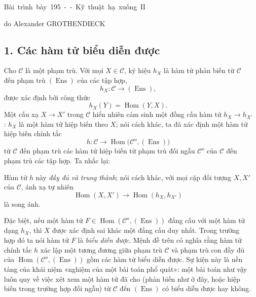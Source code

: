 \unit{Bài trình bày 195 -- Kỹ thuật hạ xuống II}
%
  {do Alexander GROTHENDIECK}


\subsection*{1. Các hàm tử biểu diễn được}

Cho $\mathcal C$ là một phạm trù. Với mọi $X\in\mathcal C$, ký hiệu $h_X$ là
hàm tử phản biến từ $\mathcal C$ đến phạm trù $(\operatorname{Ens})$ của các
tập hợp,
\[
  h_X:\mathcal C\longrightarrow(\operatorname{Ens}),
\]
được xác định bởi công thức
\[
  h_X(Y)=\operatorname{Hom}(Y,X).
\]
Một cấu xạ $X\longrightarrow X'$ trong $\mathcal C$ hiển nhiên cảm sinh một
đồng cấu hàm tử $h_X\longrightarrow h_{X'}$: $h_X$ là một hàm tử hiệp biến
theo $X$; nói cách khác, ta đã xác định một hàm tử hiệp biến chính tắc
\[
  h:\mathcal C\longrightarrow
  \operatorname{Hom}\bigl(\mathcal C^o,(\operatorname{Ens})\bigr)
\]
từ $\mathcal C$ đến phạm trù các hàm tử hiệp biến từ phạm trù đối ngẫu
$\mathcal C^o$ của $\mathcal C$ đến phạm trù các tập hợp. Ta nhắc lại:

 Hàm tử $h$ này \emph{đầy đủ và trung thành}; nói cách
khác, với mọi cặp đối tượng $X,X'$ của $\mathcal C$, ánh xạ tự nhiên
\[
  \operatorname{Hom}(X,X')\longrightarrow
  \operatorname{Hom}(h_X,h_{X'})
\]
là song ánh.

Đặc biệt, nếu một hàm tử
$F\in\operatorname{Hom}(\mathcal C^o,(\operatorname{Ens}))$ đẳng cấu với một
hàm tử dạng $h_X$, thì $X$ được xác định sai khác một đẳng cấu duy nhất.
Trong trường hợp đó ta nói hàm tử $F$ là \emph{biểu diễn được}. Mệnh đề trên
có nghĩa rằng hàm tử chính tắc $h$ xác lập một tương đương giữa phạm trù
$\mathcal C$ và phạm trù con đầy đủ của
$\operatorname{Hom}(\mathcal C^o,(\operatorname{Ens}))$ gồm các hàm tử biểu
diễn được. Sự kiện này là nền tảng của khái niệm «nghiệm của một bài toán phổ
quát»: một bài toán như vậy luôn quy về việc xét xem một hàm tử đã cho
(phản biến như ở đây, hoặc hiệp biến trong trường hợp đối ngẫu) từ
$\mathcal C$ đến $(\operatorname{Ens})$ có biểu diễn được hay không.

